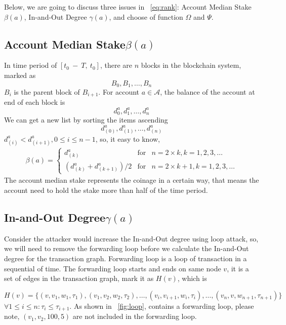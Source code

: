Below, we are going to discuss three issues in ~\ref{eq:rank}: Account Median Stake $\beta(a)$, In-and-Out Degree $\gamma(a)$, and choose of function $\Omega$ and $\Psi$.

\subsection{Account Median Stake$\beta(a)$}
In time period of $[t_0\ −\ T,\ t_0]$, there are $n$ blocks in the blockchain system, marked as
\[
B_0, B_1, \dots, B_n
\]
\noindent $B_{i}$ is the parent block of $B_{i+1}$. For account $a \in \mathcal{A}$, the balance of the account at end of each block is
\[
d^a_0, d^a_1, \dots, d^a_n
\]
We can get a new list by sorting the items ascending 
\[
d^a_{(0)}, d^a_{(1)}, \dots, d^a_{(n)}
\]
$d^a_{(i)} < d^a_{(i+1)}, 0\le i \le {n-1}$, so, it easy to know,
\begin{align}
\beta(a) = \left\{ \begin{array}{rcl}
{d^a_{(k)}} & \mbox{for} & n=2\times{}k, k=1, 2, 3, \ldots \\
{(d^a_{(k)} + d^a_{(k+1)})/2} & \mbox{for} & n=2\times{}k + 1, k=1, 2, 3, \ldots
\end{array}\right.
\end{align}
The account median stake represents the coinage in a certain way, that means the account need to hold the stake more than half of the time period.

\subsection{In-and-Out Degree$\gamma(a)$}
Consider the attacker would increase the In-and-Out degree using loop attack, so, we will need to remove the forwarding loop before we calculate the In-and-Out degree for the transaction graph. Forwarding loop is a loop of transaction in a sequential of time.
The forwarding loop starts and ends on same node $v$, it is a set of edges in the transaction graph, mark it as $H(v)$, which is

\[
H(v) = \{(v, v_1, w_1, \tau_1), (v_1, v_2, w_2, \tau_2), \dots, (v_i, v_{i+1}, w_{i}, \tau_i), \dots, (v_n, v, w_{n+1}, \tau_{n+1})\}
\]
\noindent $\forall 1\le i \le n : \tau_i \le \tau_{i+1} $.
\noindent As shown in ~\ref{fig:loop}, contains a forwarding loop, please note, $(v_1, v_2, 100, 5)$ are not included in the forwarding loop.




